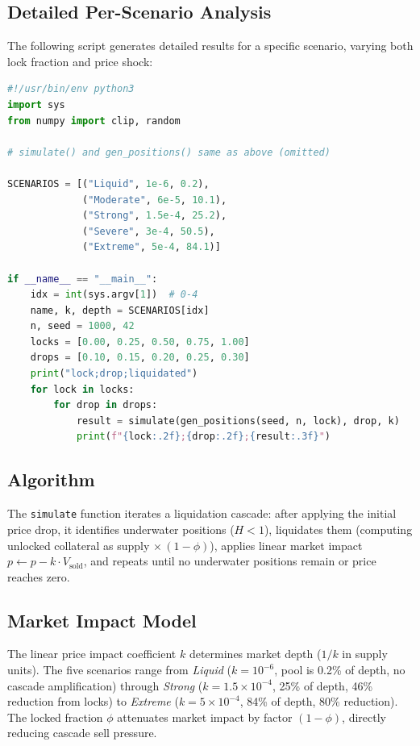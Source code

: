 \documentclass[10pt,a4paper,twocolumn]{article}
\theoremstyle{definition}
\theoremstyle{plain}
\theoremstyle{remark}
\begin{document}
\subsection{Detailed Per-Scenario Analysis}

The following script generates detailed results for a specific scenario, varying both lock fraction and price shock:

\begin{lstlisting}[language=Python, caption={Detailed cascade simulation}, label=lst:cascade-detail]
#!/usr/bin/env python3
import sys
from numpy import clip, random

# simulate() and gen_positions() same as above (omitted)

SCENARIOS = [("Liquid", 1e-6, 0.2),
             ("Moderate", 6e-5, 10.1),
             ("Strong", 1.5e-4, 25.2),
             ("Severe", 3e-4, 50.5),
             ("Extreme", 5e-4, 84.1)]

if __name__ == "__main__":
    idx = int(sys.argv[1])  # 0-4
    name, k, depth = SCENARIOS[idx]
    n, seed = 1000, 42
    locks = [0.00, 0.25, 0.50, 0.75, 1.00]
    drops = [0.10, 0.15, 0.20, 0.25, 0.30]
    print("lock;drop;liquidated")
    for lock in locks:
        for drop in drops:
            result = simulate(gen_positions(seed, n, lock), drop, k)
            print(f"{lock:.2f};{drop:.2f};{result:.3f}")
\end{lstlisting}

\subsection{Algorithm}

The \texttt{simulate} function iterates a liquidation cascade: after applying the initial price drop, it identifies underwater positions ($H < 1$), liquidates them (computing unlocked collateral as supply $\times\,(1{-}\phi)$), applies linear market impact $p \leftarrow p - k \cdot V_{\text{sold}}$, and repeats until no underwater positions remain or price reaches zero.

\subsection{Market Impact Model}

The linear price impact coefficient $k$ determines market depth ($1/k$ in supply units). The five scenarios range from \emph{Liquid} ($k = 10^{-6}$, pool is 0.2\% of depth, no cascade amplification) through \emph{Strong} ($k = 1.5 \times 10^{-4}$, 25\% of depth, 46\% reduction from locks) to \emph{Extreme} ($k = 5 \times 10^{-4}$, 84\% of depth, 80\% reduction). The locked fraction $\phi$ attenuates market impact by factor $(1{-}\phi)$, directly reducing cascade sell pressure.
\end{document}
